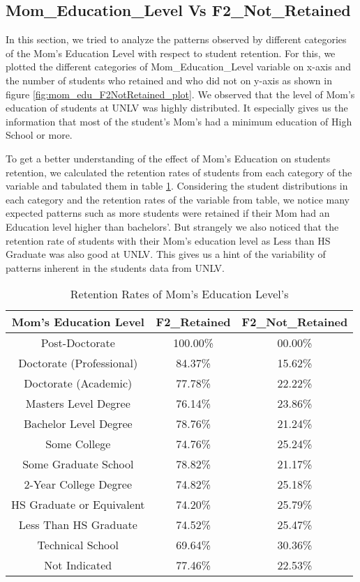 \documentclass[11pt,openright]{report}
\begin{document}
\subsection {Mom\_Education\_Level Vs F2\_Not\_Retained}
In this section, we tried to analyze the patterns observed by different categories of the Mom's Education Level with respect to student retention. For this, we plotted the different categories of Mom\_Education\_Level variable on x-axis and the number of students who retained and who did not on y-axis as shown in figure \ref{fig:mom_edu_F2NotRetained_plot}. We observed that the level of Mom's education of students at UNLV was highly distributed. It especially gives us the information that most of the student's Mom's had a minimum education of High School or more.

To get a better understanding of the effect of Mom's Education on students retention, we calculated the retention rates of students from each category of the variable and tabulated them in table  \ref{table:mom_edu_retentions}. Considering the student distributions in each category and the retention rates of the variable from table, we notice many expected patterns such as more students were retained if their Mom had an Education level higher than bachelors'. But strangely we also noticed that the retention rate of students with their Mom's education level as Less than HS Graduate was also good at UNLV. This gives us a hint of the variability of patterns inherent in the students data from UNLV.

\begin{table}[!t]
	\renewcommand{\arraystretch}{1.3}
	\caption{Retention Rates of Mom's Education Level's}
	\label{table:mom_edu_retentions}
	\centering
	\begin{tabular}{|c|c|c|}
		\hline
		\bfseries Mom's Education Level & \bfseries F2\_Retained & \bfseries F2\_Not\_Retained\\
		\hline
		Post-Doctorate  & 100.00\%  & 00.00\% \\ \hline
		Doctorate (Professional) & 84.37\% &  15.62\% \\ \hline
		Doctorate (Academic) & 77.78\% & 22.22\% \\ \hline
		Masters Level Degree    &   76.14\% &  23.86\% \\ \hline
		Bachelor Level Degree &  78.76\%  & 21.24\% \\ \hline
		Some College & 74.76\% & 25.24\% \\ \hline
		Some Graduate School  & 78.82\% &  21.17\% \\ \hline
		2-Year College Degree    &  74.82\%  & 25.18\% \\ \hline
		HS Graduate or Equivalent  & 74.20\% &  25.79\% \\ \hline
		Less Than HS Graduate     & 74.52\% &  25.47\% \\ \hline
		Technical School  &         69.64\% &  30.36\% \\ \hline
		Not Indicated         &    77.46\% & 22.53\% \\ \hline
	\end{tabular}
\end{table}
\end{document}

